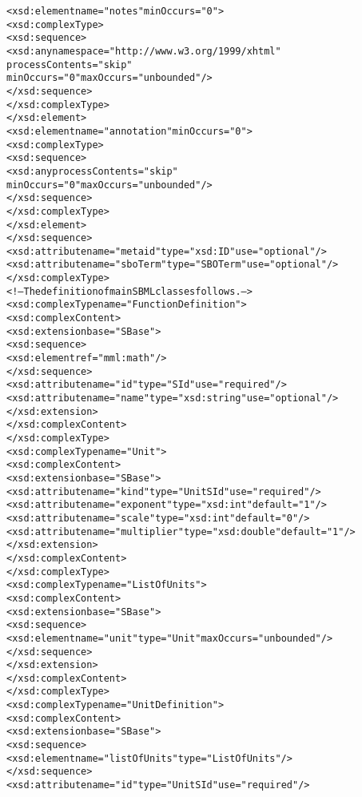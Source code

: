 \begin{alltt}
            <xsd:element name="notes" minOccurs="0">
                <xsd:complexType>
                    <xsd:sequence>
                        <xsd:any namespace="http://www.w3.org/1999/xhtml" 
                                 processContents="skip"
                                 minOccurs="0" maxOccurs="unbounded"/>
                    </xsd:sequence>
                </xsd:complexType>
            </xsd:element>
            <xsd:element name="annotation" minOccurs="0">
                <xsd:complexType>
                    <xsd:sequence>
                        <xsd:any processContents="skip" 
                                 minOccurs="0" maxOccurs="unbounded"/>
                    </xsd:sequence>
                </xsd:complexType>
            </xsd:element>
        </xsd:sequence>
        <xsd:attribute name="metaid" type="xsd:ID" use="optional"/>
        <xsd:attribute name="sboTerm" type="SBOTerm" use="optional"/>
    </xsd:complexType>
    <!--The definition of main SBML classes follows.-->
    <xsd:complexType name="FunctionDefinition">
        <xsd:complexContent>
            <xsd:extension base="SBase">
                <xsd:sequence>
                    <xsd:element ref="mml:math"/>
                </xsd:sequence>
                <xsd:attribute name="id" type="SId" use="required"/>
                <xsd:attribute name="name" type="xsd:string" use="optional"/>
            </xsd:extension>
        </xsd:complexContent>
    </xsd:complexType>
    <xsd:complexType name="Unit">
        <xsd:complexContent>
            <xsd:extension base="SBase">
                <xsd:attribute name="kind" type="UnitSId" use="required"/>
                <xsd:attribute name="exponent" type="xsd:int" default="1"/>
                <xsd:attribute name="scale" type="xsd:int" default="0"/>
                <xsd:attribute name="multiplier" type="xsd:double" default="1"/>
            </xsd:extension>
        </xsd:complexContent>
    </xsd:complexType>
    <xsd:complexType name="ListOfUnits">
        <xsd:complexContent>
            <xsd:extension base="SBase">
                <xsd:sequence>
                    <xsd:element name="unit" type="Unit" maxOccurs="unbounded"/>
                </xsd:sequence>
            </xsd:extension>
        </xsd:complexContent>
    </xsd:complexType>
    <xsd:complexType name="UnitDefinition">
        <xsd:complexContent>
            <xsd:extension base="SBase">
                <xsd:sequence>
                    <xsd:element name="listOfUnits" type="ListOfUnits"/>
                </xsd:sequence>
                <xsd:attribute name="id" type="UnitSId" use="required"/>

\end{alltt}
